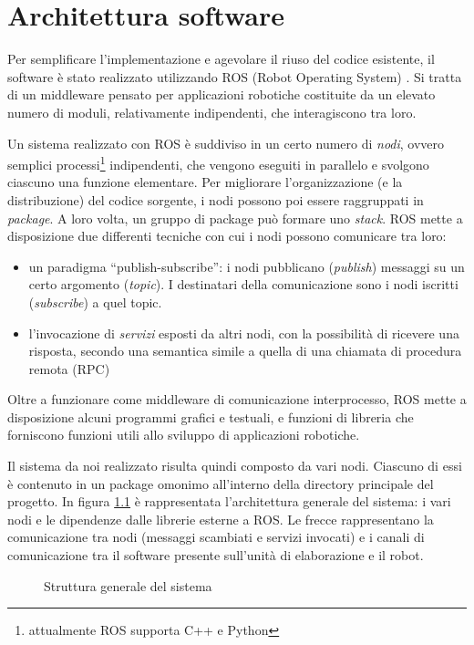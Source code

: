 \chapter{Architettura software}
\label{cap:architetturasw}

Per semplificare l'implementazione e agevolare il riuso del codice esistente, il software è stato realizzato utilizzando ROS (Robot Operating System) \cite{rosweb}. Si tratta di un middleware pensato per applicazioni robotiche costituite da un elevato numero di moduli, relativamente indipendenti, che interagiscono tra loro.

Un sistema realizzato con ROS è suddiviso in un certo numero di \emph{nodi}, ovvero semplici processi\footnote{attualmente ROS supporta C++ e Python} indipendenti, che vengono eseguiti in parallelo e svolgono ciascuno una funzione elementare. Per migliorare l'organizzazione (e la distribuzione) del codice sorgente, i nodi possono poi essere raggruppati in \emph{package}. A loro volta, un gruppo di package può formare uno \emph{stack}. ROS mette a disposizione due differenti tecniche con cui i nodi possono comunicare tra loro:
\begin{itemize}
 \item un paradigma ``publish-subscribe'': i nodi pubblicano (\emph{publish}) messaggi su un certo argomento (\emph{topic}). I destinatari della comunicazione sono i nodi iscritti (\emph{subscribe}) a quel topic.
 \item l'invocazione di \emph{servizi} esposti da altri nodi, con la possibilità di ricevere una risposta, secondo una semantica simile a quella di una chiamata di procedura remota (RPC)
\end{itemize}

Oltre a funzionare come middleware di comunicazione interprocesso, ROS mette a disposizione alcuni programmi grafici e testuali, e funzioni di libreria che forniscono funzioni utili allo sviluppo di applicazioni robotiche.

Il sistema da noi realizzato risulta quindi composto da vari nodi. Ciascuno di essi è contenuto in un package omonimo all'interno della directory principale del progetto. In figura \ref{fig:schemanodi} è rappresentata l'architettura generale del sistema: i vari nodi e le dipendenze dalle librerie esterne a ROS. Le frecce rappresentano la comunicazione tra nodi (messaggi scambiati e servizi invocati) e i canali di comunicazione tra il software presente sull'unità di elaborazione e il robot.

\begin{figure}[h]

\caption{Struttura generale del sistema} 
\label{fig:schemanodi}
\end{figure}

